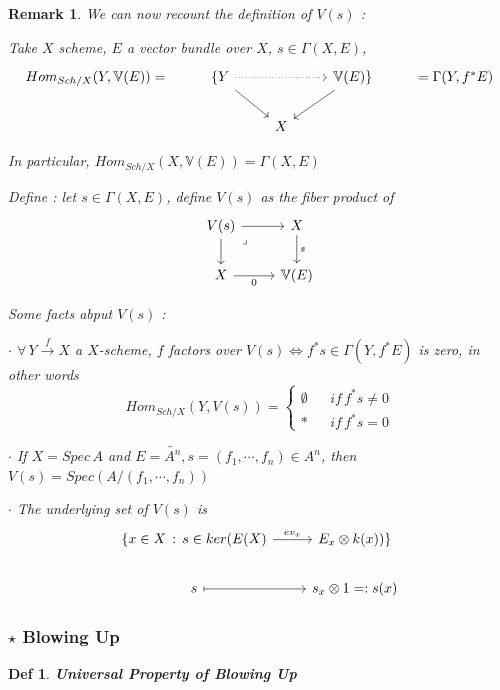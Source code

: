 \documentclass{article}
\newtheorem{definition}[theorem]{Def}
\newtheorem{remark}[theorem]{Remark}
\begin{document}
\begin{remark}
    We can now recount the definition of $V(s)$ :

    Take $X$ scheme, $E$ a vector bundle over $X$, $s\in\Gamma(X,E)$, 
    \[\begin{tikzcd}
	{Hom_{Sch/X}(Y,\mathbb V(E))=} & {\{Y} && {\mathbb V(E)\}} & {=\Gamma(Y,f^\ast E)} \\
	&& X
	\arrow[from=1-2, to=2-3]
	\arrow[dotted, from=1-2, to=1-4]
	\arrow[from=1-4, to=2-3]
\end{tikzcd}\]

In particular, $Hom_{Sch/X}(X,\mathbb V(E))=\Gamma(X, E)$

Define : let $s\in \Gamma(X, E)$, define $V(s)$ as the fiber product of 
\[\begin{tikzcd}
	{V(s)} & X \\
	X & {\mathbb V(E)}
	\arrow["0"', from=2-1, to=2-2]
	\arrow["s", from=1-2, to=2-2]
	\arrow[from=1-1, to=2-1]
	\arrow["\lrcorner"{anchor=center, pos=0.125}, draw=none, from=1-1, to=2-2]
	\arrow[from=1-1, to=1-2]
\end{tikzcd}\]

Some facts abput $V(s)$ :

$\cdot$ $\forall\, Y\xrightarrow{f}X$ a $X$-scheme, $f$ factors over $V(s)\Leftrightarrow f^\ast s\in \Gamma(Y,f^\ast E)$ is zero, in other words 
$$ 
Hom_{Sch/X}(Y,V(s))
=\left\{
\begin{array}{rcl}
\emptyset  &      & if \, f^\ast s\ne0\\
\ast  &  & if \, f^\ast s=0
\end{array} \right.
$$

$\cdot$ If $X=Spec\,A$ and $E=\widetilde {A^n},s=(f_1,\cdots,f_n)\in A^n$, then $V(s)=Spec(A/(f_1,\cdots,f_n))$

$\cdot$ The underlying set of $V(s)$ is 
\[\begin{tikzcd}
	{\{x\in X\,:\, s\in ker(E(X)} & {E_x\otimes k(x))\}} \\
	s & {s_x\otimes1=:s(x)}
	\arrow["{ev_x}", from=1-1, to=1-2]
	\arrow[maps to, from=2-1, to=2-2]
\end{tikzcd}\]
\end{remark}

\subsubsection{$\star$ Blowing Up}
\begin{definition}
\textbf{Universal Property of Blowing Up}
\end{definition}
\end{document}
